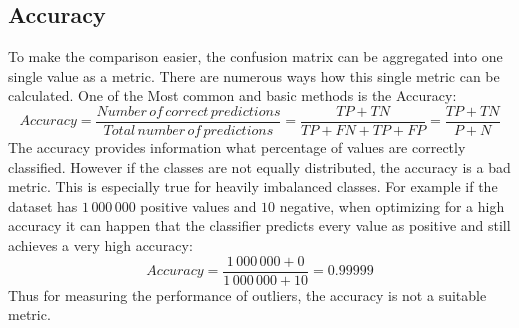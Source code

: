 \subsection{Accuracy}
To make the comparison easier, the confusion matrix can be aggregated into one single value as a metric. There are numerous ways how this single metric can be calculated. One of the Most common and basic methods is the Accuracy:
\begin{equation}
    Accuracy = \frac{Number\,of\,correct\,predictions}{Total\,number\,of\,predictions} = \frac{TP + TN}{TP + FN + TP + FP} = \frac{TP + TN}{P + N}
\end{equation}
The accuracy provides information what percentage of values are correctly classified. However if the classes are not equally distributed, the accuracy is a bad metric. This is especially true for heavily imbalanced classes. For example if the dataset has $1\,000\,000$ positive values and $10$ negative, when optimizing for a high accuracy it can happen that the classifier predicts every value as positive and still achieves a very high accuracy:
\begin{equation}
    Accuracy = \frac{1\,000\,000 + 0}{1\,000\,000 + 10} = 0.99999
\end{equation}
Thus for measuring the performance of outliers, the accuracy is not a suitable metric.

